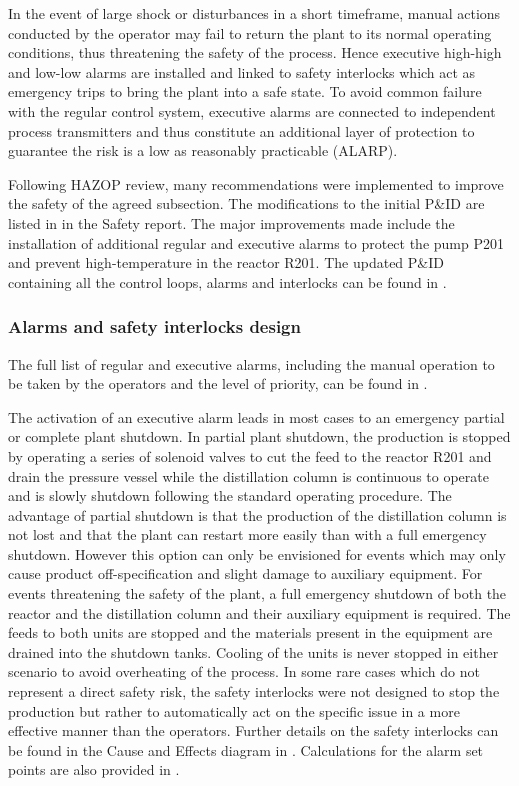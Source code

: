 In the event of large shock or disturbances in a short timeframe, manual actions conducted by the operator may fail to return the plant to its normal operating conditions, thus threatening the safety of the process. Hence executive high-high and low-low alarms are installed and linked to safety interlocks which act as emergency trips to bring the plant into a safe state. To avoid common failure with the regular control system, executive alarms are connected to independent process transmitters and thus constitute an additional layer of protection to guarantee the risk is a low as reasonably practicable (ALARP).  

Following HAZOP review, many recommendations were implemented to improve the safety of the agreed subsection. The modifications to the initial P\&ID are listed in  in the Safety report. The major improvements made include the installation of additional regular and executive alarms to protect the pump P201 and prevent high-temperature in the reactor R201. The updated P\&ID containing all the control loops, alarms and interlocks can be found in .
 

\subsubsection{Alarms and safety interlocks design}

The full list of regular and executive alarms, including the manual operation to be taken by the operators and the level of priority, can be found in . 

The activation of an executive alarm leads in most cases to an emergency partial or complete plant shutdown. In partial plant shutdown, the production is stopped by operating a series of solenoid valves to cut the feed to the reactor R201 and drain the pressure vessel while the distillation column is continuous to operate and is slowly shutdown following the standard operating procedure. The advantage of partial shutdown is that the production of the distillation column is not lost and that the plant can restart more easily than with a full emergency shutdown. However this option can only be envisioned for events which may only cause product off-specification and slight damage to auxiliary equipment. For events threatening the safety of the plant, a full emergency shutdown of both the reactor and the distillation column and their auxiliary equipment is required. The feeds to both units are stopped and the materials present in the equipment are drained into the shutdown tanks. Cooling of the units is never stopped in either scenario to avoid overheating of the process. In some rare cases which do not represent a direct safety risk, the safety interlocks were not designed to stop the production but rather to automatically act on the specific issue in a more effective manner than the operators. Further details on the safety interlocks can be found in the Cause and Effects diagram  in . Calculations for the alarm set points are also provided in .


